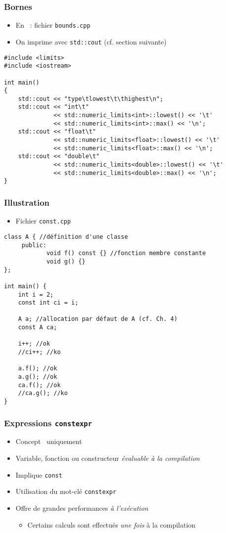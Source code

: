 \begin{frame}[containsverbatim]
\frametitle{Bornes}
\begin{itemize}
\item En \cpp\ : fichier \texttt{bounds.cpp}
\item On imprime avec \texttt{std::cout} (cf. section suivante)
\end{itemize}
\begin{lstlisting}
#include <limits>
#include <iostream>
 
int main() 
{
    std::cout << "type\tlowest\t\thighest\n";
    std::cout << "int\t"
              << std::numeric_limits<int>::lowest() << '\t'
              << std::numeric_limits<int>::max() << '\n';
    std::cout << "float\t"
              << std::numeric_limits<float>::lowest() << '\t'
              << std::numeric_limits<float>::max() << '\n';
    std::cout << "double\t"
              << std::numeric_limits<double>::lowest() << '\t'
              << std::numeric_limits<double>::max() << '\n';
}
\end{lstlisting}
\end{frame}

\begin{frame}[containsverbatim]
\frametitle{Illustration}
\begin{itemize}
\item Fichier \texttt{const.cpp}
\end{itemize}
\begin{lstlisting}
class A { //définition d'une classe
     public:
            void f() const {} //fonction membre constante
            void g() {}
};

int main() {
    int i = 2;
    const int ci = i;
    
    A a; //allocation par défaut de A (cf. Ch. 4)
    const A ca;
    
    i++; //ok
    //ci++; //ko
    
    a.f(); //ok
    a.g(); //ok
    ca.f(); //ok
    //ca.g(); //ko
}
\end{lstlisting}
\end{frame}

\begin{frame}
\frametitle{Expressions \texttt{constexpr}}
\begin{itemize}[<+->]
\item Concept \cpp\ uniquement
\item Variable, fonction ou constructeur \emph{évaluable à la compilation}
\item Implique \lstinline|const| %
\item Utilisation du mot-clé \lstinline|constexpr|
\item Offre de grandes performances \emph{à l'exécution}
	\begin{itemize}
	\item Certains calculs sont effectués \emph{une fois} à la compilation
	\end{itemize}
\end{itemize}
\end{frame}

